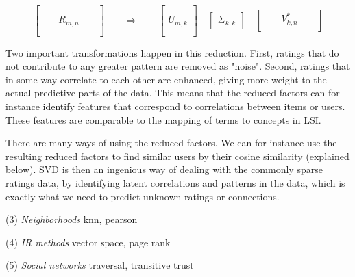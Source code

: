 \begin{equation*}
  \begin{bmatrix}
    { } & { } & { }     & { } & { }\\
    { } & { } & { }     & { } & { }\\
    { } & { } & R_{m,n} & { } & { }\\
    { } & { } & { }     & { } & { }\\
    { } & { } & { }     & { } & { }
  \end{bmatrix} 
  \qquad 
  \Rightarrow
  \qquad
  \begin{bmatrix}
    { }\\
    { }\\
    U_{m,k}\\
    { }\\
    { }
  \end{bmatrix}
  \quad
  \begin{bmatrix}
    \Sigma_{k,k}
  \end{bmatrix}
  \quad
  \begin{bmatrix}
    { } & { } & V_{k,n}^{*} & { } & { }\\
  \end{bmatrix} 
\end{equation*}

Two important transformations happen in this reduction. 
First, ratings that do not contribute to any greater pattern are removed as "noise".
Second, ratings that in some way correlate to each other are enhanced, giving more weight to the actual predictive parts of the data.
This means that the reduced factors can for instance identify features that correspond to correlations between items or users.
These features are comparable to the mapping of terms to concepts in LSI.

There are many ways of using the reduced factors.
We can for instance use the resulting reduced factors to find similar users by their cosine similarity (explained below).
SVD is then an ingenious way of dealing with the commonly sparse ratings data, by identifying latent correlations and patterns in the data,
which is exactly what we need to predict unknown ratings or connections.



(3) \emph{Neighborhoods} knn, pearson

(4) \emph{IR methods} vector space, page rank

(5) \emph{Social networks} traversal, transitive trust



